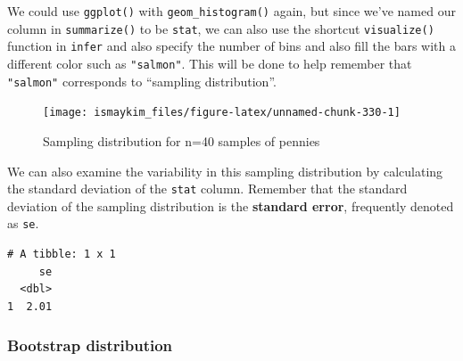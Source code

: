 \documentclass[12pt,]{krantz}
\makeatletter
\newenvironment{Shaded}{\begin{snugshade}}{\end{snugshade}}
\newcommand{\KeywordTok}[1]{\textcolor[rgb]{0.27,0.27,0.27}{\textbf{#1}}}
\newcommand{\DataTypeTok}[1]{\textcolor[rgb]{0.27,0.27,0.27}{#1}}
\newcommand{\DecValTok}[1]{\textcolor[rgb]{0.06,0.06,0.06}{#1}}
\newcommand{\StringTok}[1]{\textcolor[rgb]{0.5,0.5,0.5}{#1}}
\newcommand{\OperatorTok}[1]{\textcolor[rgb]{0.43,0.43,0.43}{\textbf{#1}}}
\newcommand{\NormalTok}[1]{#1}
\newenvironment{kframe}{%
\medskip{}
\setlength{\fboxsep}{.8em}
 \def\at@end@of@kframe{}%
 \ifinner\ifhmode%
  \def\at@end@of@kframe{\end{minipage}}%
  \begin{minipage}{\columnwidth}%
 \fi\fi%
 \def\FrameCommand##1{\hskip\@totalleftmargin \hskip-\fboxsep
 \colorbox{shadecolor}{##1}\hskip-\fboxsep
     \hskip-\linewidth \hskip-\@totalleftmargin \hskip\columnwidth}%
 \MakeFramed {\advance\hsize-\width
   \@totalleftmargin\z@ \linewidth\hsize
   \@setminipage}}%
 {\par\unskip\endMakeFramed%
 \at@end@of@kframe}
\renewenvironment{Shaded}{\begin{kframe}}{\end{kframe}}
\makeatother
\begin{document}
We could use \texttt{ggplot()} with \texttt{geom\_histogram()} again,
but since we've named our column in \texttt{summarize()} to be
\texttt{stat}, we can also use the shortcut \texttt{visualize()}
function in \texttt{infer} and also specify the number of bins and also
fill the bars with a different color such as \texttt{"salmon"}. This
will be done to help remember that \texttt{"salmon"} corresponds to
``sampling distribution''.

\begin{Shaded}
\end{Shaded}

\begin{figure}

{\centering \texttt{[image: ismaykim\_files/figure-latex/unnamed-chunk-330-1]} 

}

\caption{Sampling distribution for n=40 samples of pennies}\label{fig:unnamed-chunk-330}
\end{figure}

We can also examine the variability in this sampling distribution by
calculating the standard deviation of the \texttt{stat} column. Remember
that the standard deviation of the sampling distribution is the
\textbf{standard error}, frequently denoted as \texttt{se}.

\begin{Shaded}
\end{Shaded}

\begin{verbatim}
# A tibble: 1 x 1
     se
  <dbl>
1  2.01
\end{verbatim}

\subsubsection*{Bootstrap distribution}\label{bootstrap-distribution}
\end{document}
